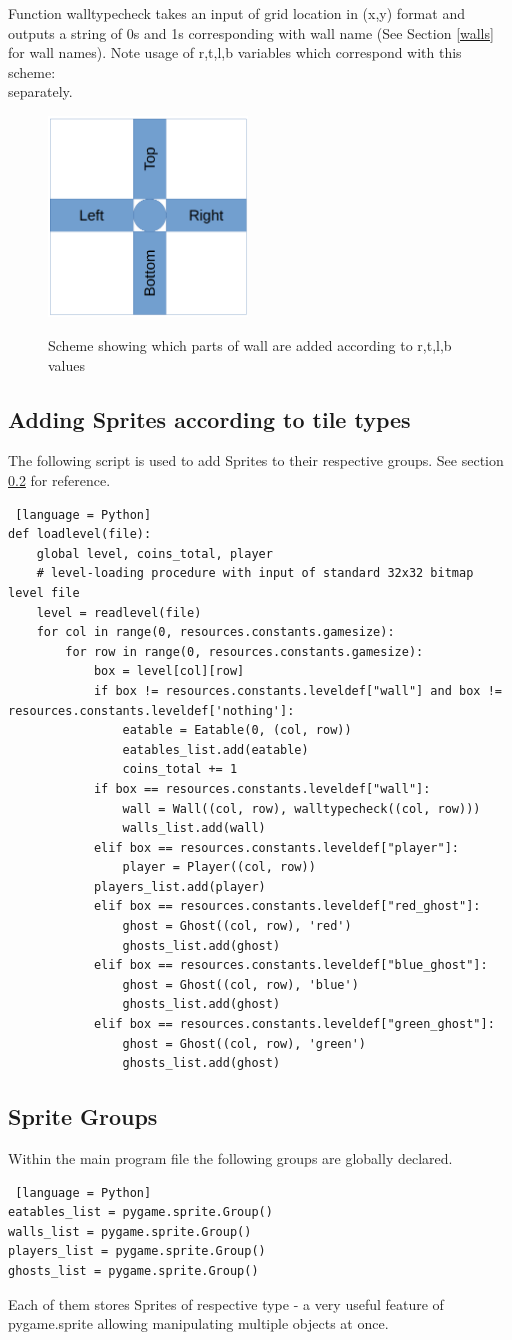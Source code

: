 \documentclass[11pt,a4paper,notitlepage]{report}
\newcommand{\dsubsection}[1]{\FloatBarrier \subsection{#1}}
\newenvironment{img}{
	\begin{center}
		\begin{figure}[H]
			\begin{center}
			
}{
	\end{center}
		\end{figure}
			\end{center}
}
\begin{document}
				Function walltypecheck takes an input of grid location in (x,y) format and outputs a string of 0s and 1s corresponding with wall name (See Section \ref{walls} for wall names). Note usage of r,t,l,b variables which correspond with this scheme:\\
				separately.
				\begin{img}
					\includegraphics[width = 150pt]{images/rtlb}\\
					\caption{Scheme showing which parts of wall are added according to r,t,l,b values}
				\end{img}
				
			\dsubsection{Adding Sprites according to tile types}
				The following script is used to add Sprites to their respective groups. See section \ref{sprite-groups} for reference.
\begin{lstlisting} [language = Python]
def loadlevel(file):
	global level, coins_total, player
	# level-loading procedure with input of standard 32x32 bitmap level file
	level = readlevel(file)
	for col in range(0, resources.constants.gamesize):
		for row in range(0, resources.constants.gamesize):
			box = level[col][row]
			if box != resources.constants.leveldef["wall"] and box != resources.constants.leveldef['nothing']:
				eatable = Eatable(0, (col, row))
				eatables_list.add(eatable)
				coins_total += 1
			if box == resources.constants.leveldef["wall"]:
				wall = Wall((col, row), walltypecheck((col, row)))
				walls_list.add(wall)
			elif box == resources.constants.leveldef["player"]:
				player = Player((col, row))
			players_list.add(player)
			elif box == resources.constants.leveldef["red_ghost"]:
				ghost = Ghost((col, row), 'red')
				ghosts_list.add(ghost)
			elif box == resources.constants.leveldef["blue_ghost"]:
				ghost = Ghost((col, row), 'blue')
				ghosts_list.add(ghost)
			elif box == resources.constants.leveldef["green_ghost"]:
				ghost = Ghost((col, row), 'green')
				ghosts_list.add(ghost)
\end{lstlisting}
			\dsubsection{Sprite Groups}
				\label{sprite-groups}
				Within the main program file the following groups are globally declared.
\begin{lstlisting} [language = Python]
eatables_list = pygame.sprite.Group()
walls_list = pygame.sprite.Group()
players_list = pygame.sprite.Group()
ghosts_list = pygame.sprite.Group()
\end{lstlisting}
				Each of them stores Sprites of respective type - a very useful feature of pygame.sprite allowing manipulating multiple objects at once.
\end{document}
